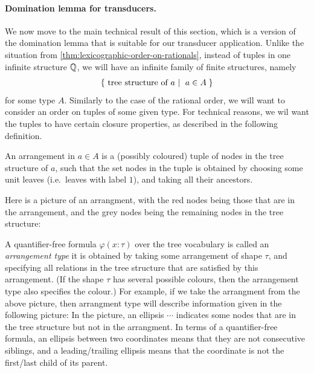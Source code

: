 






\paragraph*{Domination lemma for transducers.} We now move to the main technical result of this section, which is a version of the domination lemma that is suitable for our transducer application.  Unlike the situation from \cref{thm:lexicographic-order-on-rationals}, instead of tuples in one infinite structure ${\mathbb Q}$, we will have an infinite family of finite  structures, namely
\begin{align*}
\setbuild{\text{tree structure of $a$}}{$a \in A$}
\end{align*}
for some type $A$.  Similarly to the case of the rational order, we will want to consider an order on tuples of some given type. For technical reasons, we wil want the tuples to have certain closure properties, as described in the following definition.




\begin{definition}[Arrangement]
    An arrangement in $a \in A$ is a (possibly coloured) tuple of nodes in the tree structure of $a$, such that the set nodes in the tuple is obtained by choosing some unit leaves (i.e.~leaves with label $1$), and taking all their ancestors.
\end{definition}


 Here is a picture of an arrangment, with the red nodes being those that are in the arrangement, and the grey nodes being the remaining nodes in the tree structure:

A quantifier-free formula $\varphi(x: \tau)$ over the tree vocabulary is called an  \emph{arrangement type} it is obtained by taking some arrangement of shape $\tau$, and specifying all relations in the tree structure that are satisfied by this arrangement. (If the shape $\tau$ has several possible colours, then the arrangement type also specifies the colour.)  For example, if we take the arrangment from the above picture, then arrangment type will describe information given in the following picture:
In the picture, an ellipsis $\cdots$ indicates some nodes that are in the tree structure but not in the arrangment. In terms of a quantifier-free formula, an ellipsis between two coordinates means that they are not consecutive siblings, and a leading/trailing ellipsis means that the coordinate is not the first/last child of its parent.  



